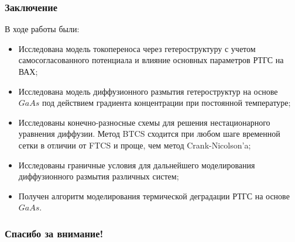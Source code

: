 \documentclass[10pt,pdf,hyperref={unicode},aspectratio={169}]{beamer}
\begin{document}
\begin{frame}
	\frametitle{Заключение}
	В ходе работы были:
	\begin{itemize}
		\item Исследована модель токопереноса через гетероструктуру с учетом самосогласованного потенциала и влияние основных параметров РТГС на ВАХ; 
		\item Исследована модель диффузионного размытия гетероструктур на основе $GaAs$ под действием градиента концентрации при постоянной температуре;
		\item Исследованы конечно-разносные схемы для решения нестационарного уравнения диффузии. Метод BTCS сходится при любом шаге временной сетки в отличии от FTCS и проще, чем метод Crank-Nicolson'a; 
		\item Исследованы граничные условия для дальнейшего моделирования диффузионного размытия различных систем; 
		\item Получен алгоритм моделирования термической деградации РТГС на основе $GaAs$.
	\end{itemize}
\end{frame}

\begin{frame}
	\frametitle{Спасибо за внимание!}
\end{frame}
\end{document}
